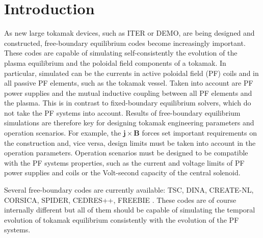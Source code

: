 
\section{Introduction} %
\label{sec:intro}

As new large tokamak devices, such as ITER or DEMO, are being designed and constructed, free-boundary equilibrium codes become increasingly important. These codes are capable of simulating self-consistently the evolution of the plasma equilibrium and the poloidal field components of a tokamak. In particular, simulated can be the currents in active poloidal field (PF) coils and in all passive PF elements, such as the tokamak vessel. Taken into account are PF power supplies and the mutual inductive coupling between all PF elements and the plasma. This is in contrast to fixed-boundary equilibrium solvers, which do not take the PF systems into account. Results of free-boundary equilibrium simulations are therefore key for designing tokamak engineering parameters and operation scenarios. For example, the ${\mathbf{j}} \times {\mathbf{B}}$ forces set important requirements on the construction and, vice versa, design limits must be taken into account in the operation parameters. Operation scenarios must be designed to be compatible with the PF systems properties, such as the current and voltage limits of PF power supplies and coils or the Volt-second capacity of the central solenoid.

Several free-boundary codes are currently available: TSC, DINA, CREATE-NL, CORSICA, SPIDER, CEDRES++, FREEBIE \cite{FREEBIERef}. These codes are of course internally different but all of them should be capable of simulating the temporal evolution of tokamak equilibrium consistently with the evolution of the PF systems.



